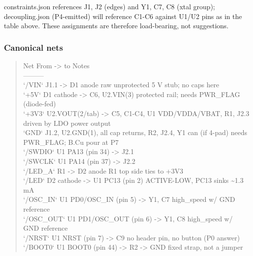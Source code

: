 \documentclass[11pt,a4paper]{article}
\begin{document}
constraints.json references J1, J2 (edges) and Y1, C7, C8 (xtal group); decoupling.json (P4-emitted) will reference C1-C6 against U1/U2 pins as in the table above. These assignments are therefore load-bearing, not suggestions.

\subsubsection*{Canonical nets}
\begin{quote}\small\ttfamily\raggedright
\textbar{} Net \textbar{} From -\textgreater{} to \textbar{} Notes \textbar{}\\
\textbar{}---\textbar{}---\textbar{}---\textbar{}\\
\textbar{} `/VIN` \textbar{} J1.1 -\textgreater{} D1 anode \textbar{} raw unprotected 5 V stub; no caps here \textbar{}\\
\textbar{} `+5V` \textbar{} D1 cathode -\textgreater{} C6, U2.VIN(3) \textbar{} protected rail; needs PWR\_FLAG (diode-fed) \textbar{}\\
\textbar{} `+3V3` \textbar{} U2.VOUT(2/tab) -\textgreater{} C5, C1-C4, U1 VDD/VDDA/VBAT, R1, J2.3 \textbar{} driven by LDO power output \textbar{}\\
\textbar{} `GND` \textbar{} J1.2, U2.GND(1), all cap returns, R2, J2.4, Y1 can (if 4-pad) \textbar{} needs PWR\_FLAG; B.Cu pour at P7 \textbar{}\\
\textbar{} `/SWDIO` \textbar{} U1 PA13 (pin 34) -\textgreater{} J2.1 \textbar{} \textbar{}\\
\textbar{} `/SWCLK` \textbar{} U1 PA14 (pin 37) -\textgreater{} J2.2 \textbar{} \textbar{}\\
\textbar{} `/LED\_A` \textbar{} R1 -\textgreater{} D2 anode \textbar{} R1 top side ties to +3V3 \textbar{}\\
\textbar{} `/LED` \textbar{} D2 cathode -\textgreater{} U1 PC13 (pin 2) \textbar{} ACTIVE-LOW, PC13 sinks \textasciitilde{}1.3 mA \textbar{}\\
\textbar{} `/OSC\_IN` \textbar{} U1 PD0/OSC\_IN (pin 5) -\textgreater{} Y1, C7 \textbar{} high\_speed w/ GND reference \textbar{}\\
\textbar{} `/OSC\_OUT` \textbar{} U1 PD1/OSC\_OUT (pin 6) -\textgreater{} Y1, C8 \textbar{} high\_speed w/ GND reference \textbar{}\\
\textbar{} `/NRST` \textbar{} U1 NRST (pin 7) -\textgreater{} C9 \textbar{} no header pin, no button (P0 answer) \textbar{}\\
\textbar{} `/BOOT0` \textbar{} U1 BOOT0 (pin 44) -\textgreater{} R2 -\textgreater{} GND \textbar{} fixed strap, not a jumper \textbar{}
\end{quote}
\end{document}
